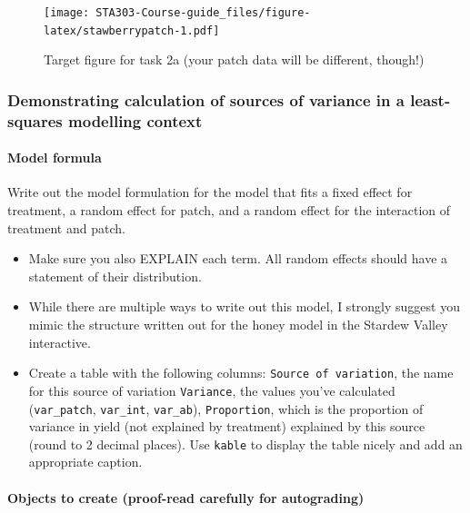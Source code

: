 \documentclass[
  openany]{book}
\begin{document}
\begin{figure}
\centering
\texttt{[image: STA303-Course-guide\_files/figure-latex/stawberrypatch-1.pdf]}
\caption{\label{fig:stawberrypatch}Target figure for task 2a (your patch data will be different, though!)}
\end{figure}

\hypertarget{demonstrating-calculation-of-sources-of-variance-in-a-least-squares-modelling-context}{%
\subsubsection{Demonstrating calculation of sources of variance in a least-squares modelling context}\label{demonstrating-calculation-of-sources-of-variance-in-a-least-squares-modelling-context}}

\hypertarget{model-formula}{%
\paragraph{Model formula}\label{model-formula}}

Write out the model formulation for the model that fits a fixed effect for treatment, a random effect for patch, and a random effect for the interaction of treatment and patch.

\begin{itemize}
\item
  Make sure you also EXPLAIN each term. All random effects should have a statement of their distribution.
\item
  While there are multiple ways to write out this model, I strongly suggest you mimic the structure written out for the honey model in the Stardew Valley interactive.
\item
  Create a table with the following columns: \texttt{Source\ of\ variation}, the name for this source of variation \texttt{Variance}, the values you've calculated (\texttt{var\_patch}, \texttt{var\_int}, \texttt{var\_ab}), \texttt{Proportion}, which is the proportion of variance in yield (not explained by treatment) explained by this source (round to 2 decimal places). Use \texttt{kable} to display the table nicely and add an appropriate caption.
\end{itemize}

\hypertarget{objects-to-create-proof-read-carefully-for-autograding}{%
\paragraph{Objects to create (proof-read carefully for autograding)}\label{objects-to-create-proof-read-carefully-for-autograding}}
\end{document}
